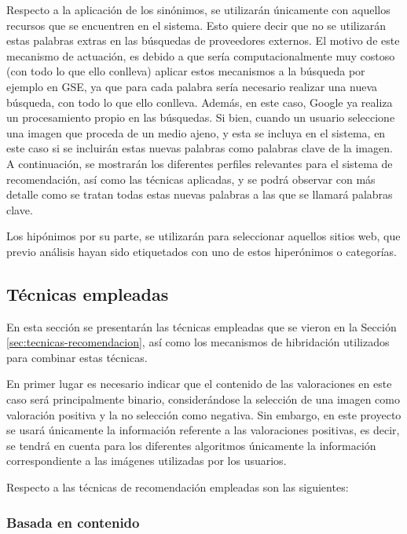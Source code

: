 Respecto a la aplicación de los sinónimos, se utilizarán únicamente con aquellos recursos que se encuentren en el sistema. Esto quiere decir que no se utilizarán estas palabras extras en las búsquedas de proveedores externos. El motivo de este mecanismo de actuación, es debido a que sería computacionalmente muy costoso (con todo lo que ello conlleva) aplicar estos mecanismos a la búsqueda por ejemplo en \acs{GSE}, ya que para cada palabra sería necesario realizar una nueva búsqueda, con todo lo que ello conlleva. Además, en este caso, Google ya realiza un procesamiento propio en las búsquedas. Si bien, cuando un usuario seleccione una imagen que proceda de un medio ajeno, y esta se incluya en el sistema, en este caso si se incluirán estas nuevas palabras como palabras clave de la imagen. A continuación, se mostrarán los diferentes perfiles relevantes para el sistema de recomendación, así como las técnicas aplicadas, y se podrá observar con más detalle como se tratan todas estas nuevas palabras a las que se llamará palabras clave.

Los hipónimos por su parte, se utilizarán para seleccionar aquellos sitios web, que previo análisis hayan sido etiquetados con uno de estos hiperónimos o categorías.

\subsection{Técnicas empleadas}
En esta sección se presentarán las técnicas empleadas que se vieron en la Sección \ref{sec:tecnicas-recomendacion}, así como los mecanismos de hibridación utilizados para combinar estas técnicas.

En primer lugar es necesario indicar que el contenido de las valoraciones en este caso será principalmente binario, considerándose la selección de una imagen como valoración positiva y la no selección como negativa. Sin embargo, en este proyecto se usará únicamente la información referente a las valoraciones positivas, es decir, se tendrá en cuenta para los diferentes algoritmos únicamente la información correspondiente a las imágenes utilizadas por los usuarios.

Respecto a las técnicas de recomendación empleadas son las siguientes:\\

\subsubsection{Basada en contenido}


